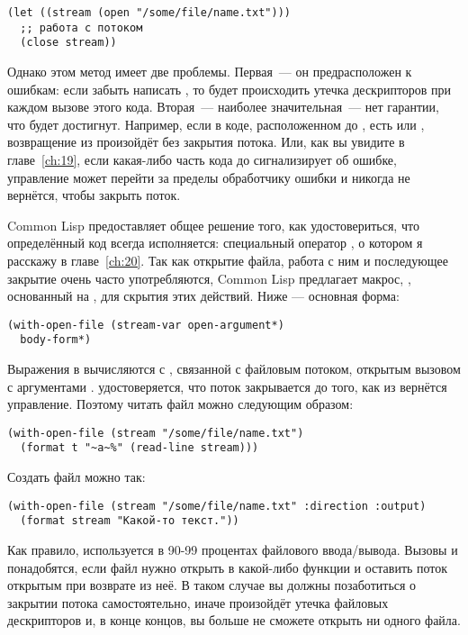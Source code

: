 \begin{lstlisting}
(let ((stream (open "/some/file/name.txt"))) 
  ;; работа с потоком
  (close stream)) 
\end{lstlisting}

Однако этом метод имеет две проблемы. Первая~--- он предрасположен к ошибкам: если забыть
написать , то будет происходить утечка дескрипторов при каждом вызове этого
кода. Вторая~--- наиболее значительная~--- нет гарантии, что  будет
достигнут. Например, если в коде, расположенном до , есть  или
, возвращение из  произойдёт без закрытия потока. Или, как вы
увидите в главе~\ref{ch:19}, если какая-либо часть кода до  сигнализирует об
ошибке, управление может перейти за пределы  обработчику ошибки и никогда не
вернётся, чтобы закрыть поток.

Common Lisp предоставляет общее решение того, как удостовериться, что определённый код
всегда исполняется: специальный оператор , о котором я расскажу в
главе~\ref{ch:20}. Так как открытие файла, работа с ним и последующее закрытие очень часто
употребляются, Common Lisp предлагает макрос, , основанный на
, для скрытия этих действий. Ниже — основная форма:

\begin{lstlisting}
(with-open-file (stream-var open-argument*) 
  body-form*) 
\end{lstlisting}

Выражения в  вычисляются с , связанной с файловым
потоком, открытым вызовом  с аргументами
.  удостоверяется, что поток 
закрывается до того, как из  вернётся управление. Поэтому читать файл
можно следующим образом:

\begin{lstlisting}
(with-open-file (stream "/some/file/name.txt") 
  (format t "~a~%" (read-line stream))) 
\end{lstlisting}

Создать файл можно так:

\begin{lstlisting}
(with-open-file (stream "/some/file/name.txt" :direction :output) 
  (format stream "Какой-то текст.")) 
\end{lstlisting}

Как правило,  используется в 90-99 процентах файлового
ввода/вывода. Вызовы  и  понадобятся, если файл нужно открыть в
какой-либо функции и оставить поток открытым при возврате из неё. В таком случае вы должны
позаботиться о закрытии потока самостоятельно, иначе произойдёт утечка файловых
дескрипторов и, в конце концов, вы больше не сможете открыть ни одного файла.

